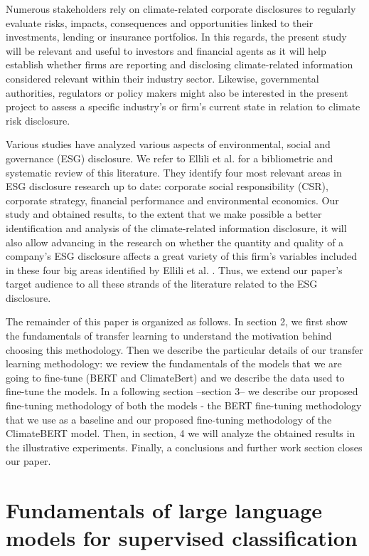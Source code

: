 \documentclass[runningheads]{llncs}
\begin{document}
Numerous stakeholders rely on climate-related corporate disclosures to regularly evaluate risks, impacts, consequences and opportunities linked to their investments, lending or insurance portfolios. In this regards, the present study will be relevant and useful to investors and financial agents as it will help establish whether firms are reporting and disclosing climate-related information considered relevant within their industry sector. Likewise, governmental authorities, regulators or policy makers might also be interested in the present project to assess a specific industry’s or firm’s current state in relation to climate risk disclosure.  

Various studies have analyzed various aspects of environmental, social and governance (ESG) disclosure. We refer to  Ellili et al. \cite{ellili2022bibliometric} for a bibliometric and systematic review of this literature. They identify four most relevant areas in ESG disclosure research up to date: corporate social responsibility (CSR), corporate strategy, financial performance and environmental economics. Our study and obtained results, to the extent that we make possible a better identification and analysis of the climate-related information disclosure, it will also allow advancing in the research on whether the quantity and quality of a company’s ESG disclosure affects a great variety of this firm’s variables included in these four big areas identified by Ellili et al. \cite{ellili2022bibliometric}. Thus, we extend our paper’s target audience to all these strands of the literature related to the ESG disclosure.  

The remainder of this paper is organized as follows. In section 2, we first show the fundamentals of transfer learning to understand the motivation behind choosing this methodology. Then we describe the particular details of our transfer learning methodology: we  review the fundamentals of the models that we are going to fine-tune (BERT and ClimateBert) and we describe the data used to fine-tune the models. In a following section –section 3–  we describe our proposed fine-tuning methodology of both the models - the BERT fine-tuning methodology that we use as a baseline and our proposed fine-tuning methodology of the ClimateBERT model. Then, in section, 4 we will analyze the obtained results in the illustrative experiments. Finally, a conclusions and further work section closes our paper. 

\section{Fundamentals of large language models for supervised classification}
\end{document}
